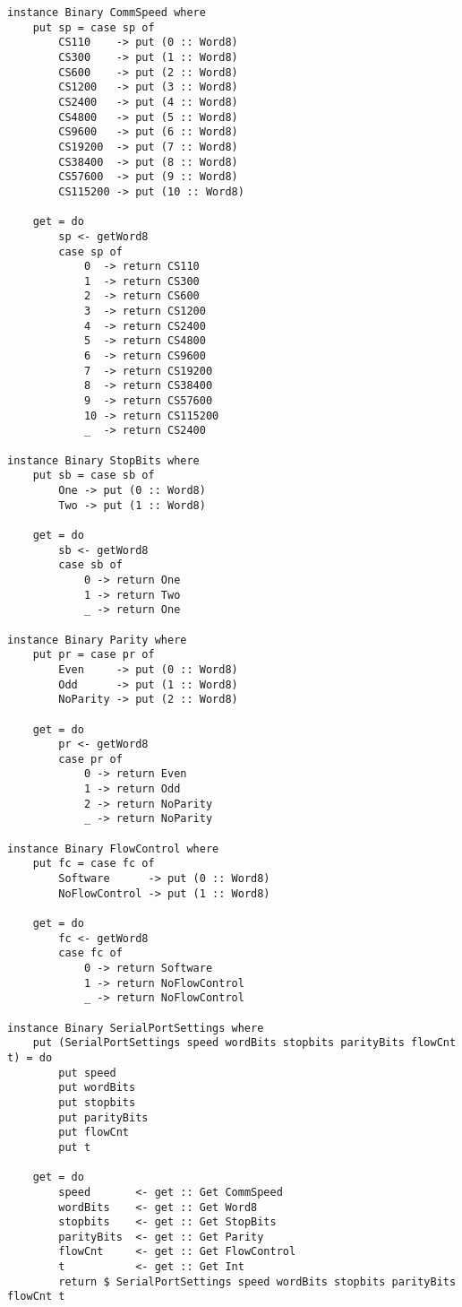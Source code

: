 \documentclass[russian,utf8,simple,emptystyle]{eskdtext}
\begin{document}
\begin{lstlisting}
instance Binary CommSpeed where
    put sp = case sp of 
        CS110    -> put (0 :: Word8)
        CS300    -> put (1 :: Word8)    
        CS600    -> put (2 :: Word8)    
        CS1200   -> put (3 :: Word8)    
        CS2400   -> put (4 :: Word8)   
        CS4800   -> put (5 :: Word8)   
        CS9600   -> put (6 :: Word8)   
        CS19200  -> put (7 :: Word8)  
        CS38400  -> put (8 :: Word8)  
        CS57600  -> put (9 :: Word8)  
        CS115200 -> put (10 :: Word8)

    get = do
        sp <- getWord8
        case sp of
            0  -> return CS110    
            1  -> return CS300    
            2  -> return CS600    
            3  -> return CS1200   
            4  -> return CS2400   
            5  -> return CS4800   
            6  -> return CS9600   
            7  -> return CS19200  
            8  -> return CS38400  
            9  -> return CS57600  
            10 -> return CS115200
            _  -> return CS2400  

instance Binary StopBits where
    put sb = case sb of 
        One -> put (0 :: Word8)
        Two -> put (1 :: Word8)

    get = do
        sb <- getWord8
        case sb of
            0 -> return One
            1 -> return Two
            _ -> return One

instance Binary Parity where
    put pr = case pr of 
        Even     -> put (0 :: Word8)
        Odd      -> put (1 :: Word8)
        NoParity -> put (2 :: Word8)

    get = do
        pr <- getWord8
        case pr of
            0 -> return Even 
            1 -> return Odd 
            2 -> return NoParity
            _ -> return NoParity

instance Binary FlowControl where
    put fc = case fc of
        Software      -> put (0 :: Word8)
        NoFlowControl -> put (1 :: Word8)

    get = do
        fc <- getWord8
        case fc of
            0 -> return Software
            1 -> return NoFlowControl
            _ -> return NoFlowControl

instance Binary SerialPortSettings where
    put (SerialPortSettings speed wordBits stopbits parityBits flowCnt t) = do
        put speed
        put wordBits
        put stopbits
        put parityBits
        put flowCnt
        put t

    get = do
        speed       <- get :: Get CommSpeed
        wordBits    <- get :: Get Word8
        stopbits    <- get :: Get StopBits
        parityBits  <- get :: Get Parity
        flowCnt     <- get :: Get FlowControl
        t           <- get :: Get Int
        return $ SerialPortSettings speed wordBits stopbits parityBits flowCnt t


\end{lstlisting}
\end{document}
